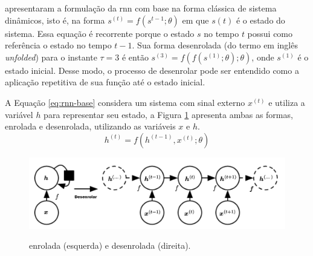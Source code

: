 \textcite{Goodfellow2016DeepLearning} apresentaram a formulação da \gls{rnn} com base na forma clássica de sistema dinâmicos, isto é, na forma $s^{(t)} = f(s^{t-1}; \theta)$ em que $s{(t)}$ é o estado do sistema. Essa equação é recorrente porque o estado $s$ no tempo $t$ possui como referência o estado no tempo $t-1$. Sua forma desenrolada (do termo em inglês \textit{unfolded}) para o instante $\tau = 3$ é então $s^{(3)} = f(f(s^{(1)}; \theta); \theta)$, onde $s^{(1)}$ é o estado inicial. Desse modo, o processo de desenrolar pode ser entendido como a aplicação repetitiva de sua função até o estado inicial.

A Equação \ref{eq:rnn-base} considera um sistema com sinal externo $x^{(t)}$ e utiliza a variável $h$ para representar seu estado, a Figura \ref{fig:rnn-desenrolada} apresenta ambas as formas, enrolada e desenrolada, utilizando as variáveis $x$ e $h$.
\begin{equation}
    \label{eq:rnn-base}
    h^{(t)} = f(h^{(t-1)}, x^{(t)}; \theta)
\end{equation}

\begin{figure}[htbp]
    \centering
        \caption{ enrolada (esquerda) e desenrolada (direita).}
        \includegraphics[scale=0.60]{resources/images/pln/rnn-desenrolada.png}
        \label{fig:rnn-desenrolada}
\end{figure}

